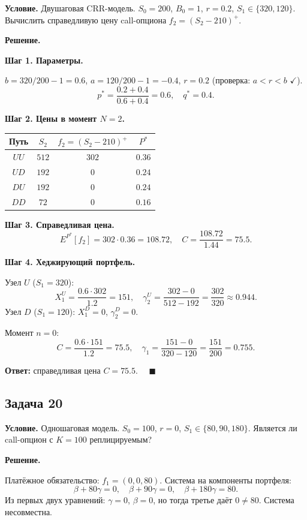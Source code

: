 \documentclass[12pt,a4paper]{article}
\theoremstyle{zadacha}
\begin{document}
\textbf{Условие.} Двушаговая CRR-модель. $S_0 = 200$, $B_0 = 1$, $r = 0.2$, $S_1 \in \{320, 120\}$. Вычислить справедливую цену call-опциона $f_2 = (S_2 - 210)^+$.

\medskip
\textbf{Решение.}

\textbf{Шаг 1. Параметры.}

$b = 320/200 - 1 = 0.6$, $a = 120/200 - 1 = -0.4$, $r = 0.2$ (проверка: $a < r < b$ $\checkmark$).
\[
p^* = \frac{0.2 + 0.4}{0.6 + 0.4} = 0.6, \quad q^* = 0.4.
\]

\textbf{Шаг 2. Цены в момент $N = 2$.}

\begin{center}
\begin{tabular}{cccc}
\toprule
Путь & $S_2$ & $f_2 = (S_2-210)^+$ & $P^*$ \\
\midrule
$UU$ & $512$ & $302$ & $0.36$ \\
$UD$ & $192$ & $0$ & $0.24$ \\
$DU$ & $192$ & $0$ & $0.24$ \\
$DD$ & $72$ & $0$ & $0.16$ \\
\bottomrule
\end{tabular}
\end{center}

\textbf{Шаг 3. Справедливая цена.}
\[
E^{P^*}[f_2] = 302 \cdot 0.36 = 108.72, \quad C = \frac{108.72}{1.44} = 75.5.
\]

\textbf{Шаг 4. Хеджирующий портфель.}

Узел $U$ ($S_1 = 320$):
\[
X_1^U = \frac{0.6 \cdot 302}{1.2} = 151, \quad
\gamma_2^U = \frac{302 - 0}{512 - 192} = \frac{302}{320} \approx 0.944.
\]
Узел $D$ ($S_1 = 120$): $X_1^D = 0$, $\gamma_2^D = 0$.

Момент $n = 0$:
\[
C = \frac{0.6 \cdot 151}{1.2} = 75.5, \quad
\gamma_1 = \frac{151 - 0}{320 - 120} = \frac{151}{200} = 0.755.
\]

\textbf{Ответ:} справедливая цена $C = 75.5$. $\quad\blacksquare$

\subsection*{Задача 20}

\textbf{Условие.} Одношаговая модель. $S_0 = 100$, $r = 0$, $S_1 \in \{80, 90, 180\}$. Является ли call-опцион с $K = 100$ реплицируемым?

\medskip
\textbf{Решение.}

Платёжное обязательство: $f_1 = (0, 0, 80)$. Система на компоненты портфеля:
\[
\beta + 80\gamma = 0, \quad \beta + 90\gamma = 0, \quad \beta + 180\gamma = 80.
\]
Из первых двух уравнений: $\gamma = 0$, $\beta = 0$, но тогда третье даёт $0 \neq 80$. Система несовместна.
\end{document}
